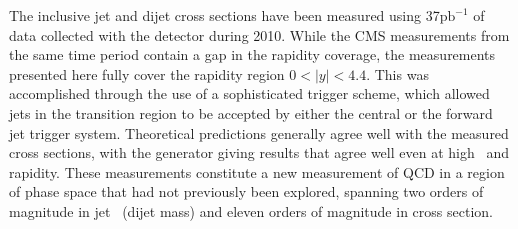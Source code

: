 The inclusive jet and dijet cross sections have been measured using 37$\mathrm{pb}^{-1}$ of data collected with the \atlas detector during 2010. While the CMS measurements from the same time period contain a gap in the rapidity coverage, the measurements presented here fully cover the rapidity region $0 < |y| < 4.4$. This was accomplished through the use of a sophisticated trigger scheme, which allowed jets in the transition region to be accepted by either the central or the forward jet trigger system. Theoretical predictions generally agree well with the measured cross sections, with the \powheg generator giving results that agree well even at high \pt~and rapidity. These measurements constitute a new measurement of QCD in a region of phase space that had not previously been explored, spanning two orders of magnitude in jet \pt~(dijet mass) and eleven orders of magnitude in cross section.

